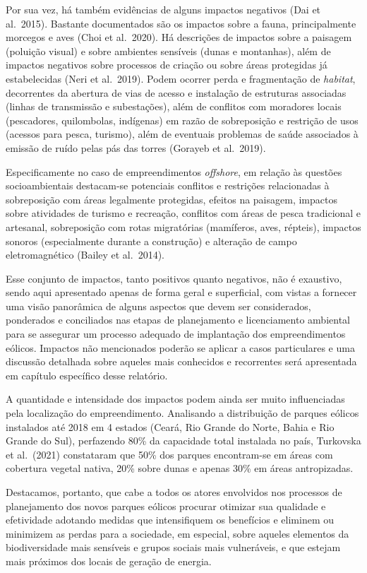 \documentclass[
  oneside]{scrbook}
\begin{document}
Por sua vez, há também evidências de alguns impactos negativos (Dai et al.~2015). Bastante documentados são os impactos sobre a fauna, principalmente morcegos e aves (Choi et al.~2020). Há descrições de impactos sobre a paisagem (poluição visual) e sobre ambientes sensíveis (dunas e montanhas), além de impactos negativos sobre processos de criação ou sobre áreas protegidas já estabelecidas (Neri et al.~2019). Podem ocorrer perda e fragmentação de \emph{habitat}, decorrentes da abertura de vias de acesso e instalação de estruturas associadas (linhas de transmissão e subestações), além de conflitos com moradores locais (pescadores, quilombolas, indígenas) em razão de sobreposição e restrição de usos (acessos para pesca, turismo), além de eventuais problemas de saúde associados à emissão de ruído pelas pás das torres (Gorayeb et al.~2019).

Especificamente no caso de empreendimentos \emph{offshore}, em relação às questões socioambientais destacam-se potenciais conflitos e restrições relacionadas à sobreposição com áreas legalmente protegidas, efeitos na paisagem, impactos sobre atividades de turismo e recreação, conflitos com áreas de pesca tradicional e artesanal, sobreposição com rotas migratórias (mamíferos, aves, répteis), impactos sonoros (especialmente durante a construção) e alteração de campo eletromagnético (Bailey et al.~2014).

Esse conjunto de impactos, tanto positivos quanto negativos, não é exaustivo, sendo aqui apresentado apenas de forma geral e superficial, com vistas a fornecer uma visão panorâmica de alguns aspectos que devem ser considerados, ponderados e conciliados nas etapas de planejamento e licenciamento ambiental para se assegurar um processo adequado de implantação dos empreendimentos eólicos. Impactos não mencionados poderão se aplicar a casos particulares e uma discussão detalhada sobre aqueles mais conhecidos e recorrentes será apresentada em capítulo específico desse relatório.

A quantidade e intensidade dos impactos podem ainda ser muito influenciadas pela localização do empreendimento. Analisando a distribuição de parques eólicos instalados até 2018 em 4 estados (Ceará, Rio Grande do Norte, Bahia e Rio Grande do Sul), perfazendo 80\% da capacidade total instalada no país, Turkovska et al.~(2021) constataram que 50\% dos parques encontram-se em áreas com cobertura vegetal nativa, 20\% sobre dunas e apenas 30\% em áreas antropizadas.

Destacamos, portanto, que cabe a todos os atores envolvidos nos processos de planejamento dos novos parques eólicos procurar otimizar sua qualidade e efetividade adotando medidas que intensifiquem os benefícios e eliminem ou minimizem as perdas para a sociedade, em especial, sobre aqueles elementos da biodiversidade mais sensíveis e grupos sociais mais vulneráveis, e que estejam mais próximos dos locais de geração de energia.
\end{document}
